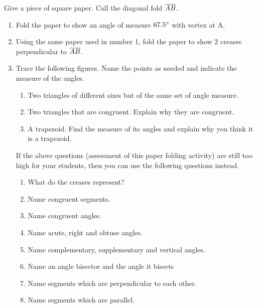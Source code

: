 Give a piece of square paper. Call the diagonal fold $\overline{AB}$.
\begin{enumerate}
\item Fold the paper to show an angle of measure $67.5\mathrm{^{\circ}}$ with vertex at A.
\item Using the same paper used in number 1, fold the paper to show 2 creases perpendicular to $\overline{AB}$.
\item Trace the following figures. Name the points as needed and indicate the measure of the angles.
	\begin{enumerate}
	\item Two triangles of different sizes but of the same set of angle measure.
	\item Two triangles that are congruent. Explain why they are congruent.
	\item A trapezoid. Find the measure of its angles and explain why you think it is a trapezoid.
	\end{enumerate}
	If the above questions (assessment of this paper folding activity) are still too high for
	your students, then you can use the following questions instead.
	\begin{enumerate}
	\item What do the creases represent?
	\item Name congruent segments.
	\item Name congruent angles.
	\item Name acute, right and obtuse angles.
	\item Name complementary, supplementary and vertical angles.
	\item Name an angle bisector and the angle it bisects
	\item Name segments which are perpendicular to each other.
	\item Name segments which are parallel.
	\end{enumerate}
\end{enumerate}
